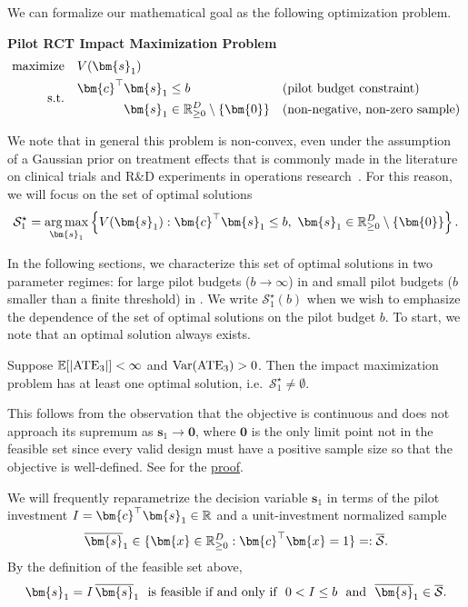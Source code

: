 We can formalize our mathematical goal as the following optimization problem.

\vspace{0.1cm}
\medskip
\noindent\textbf{Pilot RCT Impact Maximization Problem}
\vspace{0.1cm}
\begin{align*}
  \text{maximize}\quad  &
  V(\bm{s}_1)\\
  \text{s.t.}\quad &
  \begin{aligned}
    \bm{c}^{\top}\bm{s}_{1} & \le b &  & \text{(pilot
    budget constraint)}\\
    \bm{s}_{1} & \in\R_{\geq 0}^{D} \setminus \{\bm{0}\} &  &
    \text{(non-negative, non-zero
    sample)}
  \end{aligned}
\end{align*}

\vspace{0.2cm}
\noindent We note that in general this problem is non-convex, even under the assumption of a Gaussian prior on treatment effects that is commonly made in the literature on clinical trials and R\&D experiments in operations research~\cite{FrazierPo09,ChickGa22}.
For this reason, we will focus on the set of optimal solutions
\[
  \mathcal{S}_1^{\star}
  =
  \underset{\bm{s}_1}{\arg\max}
  \left\{
    V(\bm{s}_1) :
    \bm{c}^\top\bm{s}_1 \leq b,\
    \bm{s}_1 \in \R_{\geq 0}^{D} \setminus \{\bm{0}\}
  \right\}.
\]

In the following sections, we characterize this set of optimal solutions in two parameter regimes: for  large pilot budgets ($b\to\infty$) in  and small pilot budgets ($b$ smaller than a finite threshold) in .
We write $\mathcal{S}_1^{\star}(b)$ when we wish to emphasize the dependence of the set of optimal solutions on the pilot budget $b$.
To start, we note that an optimal solution always exists.

\begin{proposition}
  \label{prop:optimal-solution-exists}
  Suppose $\mathbb{E}[|\mathrm{ATE}_3|]<\infty$ and ${\rm Var}(\mathrm{ATE}_3)>0$.
  Then the impact maximization problem has at least one optimal solution, i.e.\ $\mathcal{S}_1^{\star}\neq\emptyset$.
\end{proposition}

This follows from the observation that the objective is continuous and does not approach its supremum as $\bm{s}_1\to\bm{0}$, where $\bm{0}$ is the only limit point not in the feasible set since every valid design must have a positive sample size so that the objective is well-defined.
See \Cref{\sectionof{prop:optimal-solution-exists-appendix}} for the
\hyperref[prop:optimal-solution-exists-appendix]{proof}.

We will frequently reparametrize the decision variable $\bm{s}_1$ in terms of the pilot investment $\invst=\bm{c}^{\top}\bm{s}_1\in\R$ and a unit-investment normalized sample
\[
  \overline{\bm{s}}_1\in\{\bm{x}\in\R_{\geq 0}^D : \bm{c}^\top
  \bm{x}=1\}\eqdef\overline{\mathcal{S}}.
\]
By the definition of the feasible set above,
\[
  \bm{s}_1 = \invst\,\overline{\bm{s}}_1\ \ \text{is feasible if and
  only if}\ \ 0 < \invst \le
  b\ \ \text{and}\ \ \overline{\bm{s}}_1\in\overline{\mathcal{S}}.
\]
